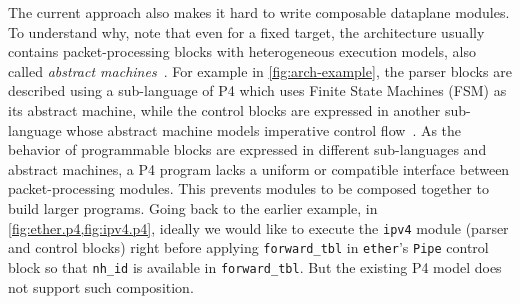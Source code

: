 \documentclass[letterpaper,twocolumn,10pt]{article}
\begin{document}
%
The current approach also makes it hard to write composable dataplane
modules. To understand why, note that even for a fixed target, the
architecture usually contains packet-processing blocks with
heterogeneous execution models, also called \emph{abstract
machines}~\cite{p4lang,van1991machine}. For example in
\cref{fig:arch-example}, the parser blocks are described using a
sub-language of P4 which uses Finite State Machines (FSM) as its
abstract machine, while the control blocks are expressed in another
sub-language whose abstract machine models imperative control
flow~\cite{p4lang}. As the behavior of programmable blocks are
expressed in different sub-languages and abstract machines, a P4
program lacks a uniform or compatible interface between
packet-processing modules. This prevents modules to be composed
together to build larger programs. Going back to the earlier example,
in \cref{fig:ether.p4,fig:ipv4.p4}, ideally we would like to execute the
\texttt{ipv4} module (parser and control blocks) right before applying
\texttt{forward\_tbl} in \texttt{ether}'s \texttt{Pipe} control block so
that \texttt{nh\_id} is available in \texttt{forward\_tbl}. But the
existing P4 model does not support such composition.

\end{document}
